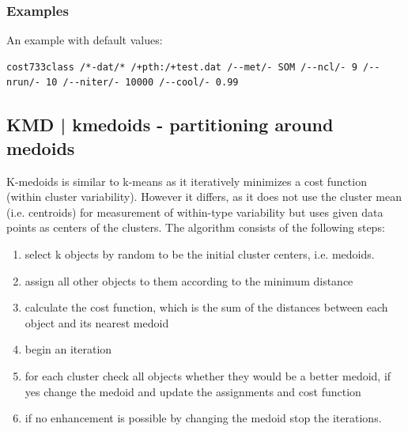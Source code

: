 \documentclass[12pt, oneside, a4paper, headsepline, plainheadsepline]{scrbook}
\begin{document}
\subsubsection*{Examples}
An example with default values:
\begin{lstlisting}
cost733class /*-dat/* /+pth:/+test.dat /--met/- SOM /--ncl/- 9 /--nrun/- 10 /--niter/- 10000 /--cool/- 0.99 
\end{lstlisting}

\subsection{KMD | kmedoids - partitioning around medoids}

K-medoids is similar to k-means as it iteratively minimizes a cost function (within cluster variability). 
However it differs, as it does not use the cluster mean (i.e. centroids) for measurement of within-type 
variability but uses given data points as centers of the clusters. The algorithm consists of the following steps:
\begin{enumerate}
\item select k objects by random to be the initial cluster centers, i.e. medoids.
\item assign all other objects to them according to the minimum distance
\item calculate the cost function, which is the sum of the distances between each object and its nearest medoid
\item begin an iteration
\item for each cluster check all objects whether they would be a better medoid, if yes change the medoid and update the 
assignments and cost function
\item if no enhancement is possible by changing the medoid stop the iterations.
\end{enumerate}

\end{document}
